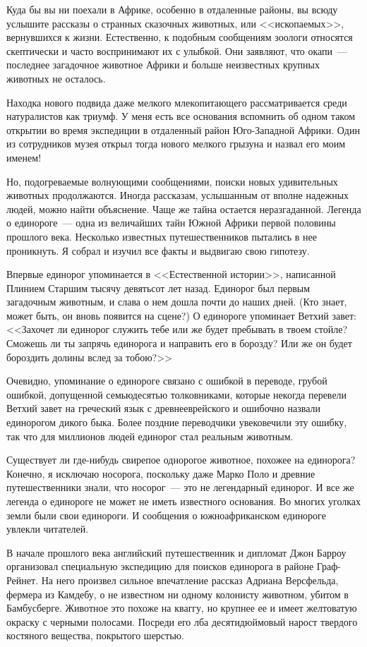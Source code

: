 \documentclass[12pt,a4paper,twoside,openany,svgnames]{memoir}
\begin{document}
Куда бы вы ни поехали в Африке, особенно в отдаленные районы, вы всюду услышите рассказы о странных сказочных животных, или <<ископаемых>>, вернувшихся к жизни. Естественно, к подобным сообщениям зоологи относятся скептически и часто воспринимают их с улыбкой. Они заявляют, что окапи~--- последнее загадочное животное Африки и больше неизвестных крупных животных не осталось.

Находка нового подвида даже мелкого млекопитающего рассматривается среди натуралистов как триумф. У меня есть все основания вспомнить об одном таком открытии во время экспедиции в отдаленный район Юго-Западной Африки. Один из сотрудников музея открыл тогда нового мелкого грызуна и назвал его моим именем!

Но, подогреваемые волнующими сообщениями, поиски новых удивительных животных продолжаются. Иногда рассказам, услышанным от вполне надежных людей, можно найти объяснение. Чаще же тайна остается неразгаданной. Легенда о единороге~--- одна из величайших тайн Южной Африки первой половины прошлого века. Несколько известных путешественников пытались в нее проникнуть. Я собрал и изучил все факты и выдвигаю свою гипотезу.

Впервые единорог упоминается в <<Естественной истории>>, написанной Плинием Старшим тысячу девятьсот лет назад. Единорог был первым загадочным животным, и слава о нем дошла почти до наших дней. (Кто знает, может быть, он вновь появится на сцене?) О единороге упоминает Ветхий завет: <<Захочет ли единорог служить тебе или же будет пребывать в твоем стойле? Сможешь ли ты запрячь единорога и направить его в борозду? Или же он будет бороздить долины вслед за тобою?>>

Очевидно, упоминание о единороге связано с ошибкой в переводе, грубой ошибкой, допущенной семьюдесятью толковниками, которые некогда перевели Ветхий завет на греческий язык с древнееврейского и ошибочно назвали единорогом дикого быка. Более поздние переводчики увековечили эту ошибку, так что для миллионов людей единорог стал реальным животным.

Существует ли где-нибудь свирепое однорогое животное, похожее на единорога? Конечно, я исключаю носорога, поскольку даже Марко Поло и древние путешественники знали, что носорог~--- это не легендарный единорог. И все же легенда о единороге не может не иметь известного основания. Во многих уголках земли были свои единороги. И сообщения о южноафриканском единороге увлекли читателей.

В начале прошлого века английский путешественник и дипломат Джон Барроу организовал специальную экспедицию для поисков единорога в районе Граф-Рейнет. На него произвел сильное впечатление рассказ Адриана Версфельда, фермера из Камдебу, о не известном ни одному колонисту животном, убитом в Бамбусберге. Животное это похоже на кваггу, но крупнее ее и имеет желтоватую окраску с черными полосами. Посреди его лба десятидюймовый нарост твердого костяного вещества, покрытого шерстью.
\end{document}
